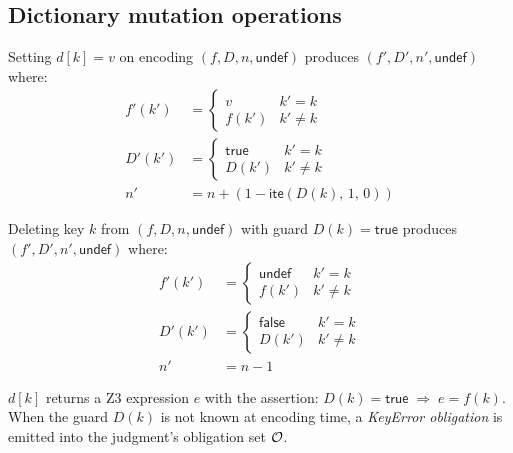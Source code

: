 \documentclass[11pt]{article}
\begin{document}
\subsection{Dictionary mutation operations}

\begin{definition}\label{def:dictins}
Setting $d[k] = v$ on encoding $(f, D, n, \mathsf{undef})$ produces
$(f', D', n', \mathsf{undef})$ where:
\begin{align}
  f'(k') &= \begin{cases} v & k' = k \\ f(k') & k' \neq k \end{cases} \tag{DI-Val}\\
  D'(k') &= \begin{cases} \mathsf{true} & k' = k \\ D(k') & k' \neq k \end{cases} \tag{DI-Dom}\\
  n'     &= n + (1 - \mathsf{ite}(D(k),\,1,\,0)) \tag{DI-Card}
\end{align}
\end{definition}

\begin{definition}\label{def:dictdel}
Deleting key $k$ from $(f, D, n, \mathsf{undef})$ with guard $D(k) =
\mathsf{true}$ produces $(f', D', n', \mathsf{undef})$ where:
\begin{align}
  f'(k')  &= \begin{cases} \mathsf{undef} & k' = k \\ f(k') & k' \neq k \end{cases} \tag{DD-Val}\\
  D'(k')  &= \begin{cases} \mathsf{false} & k' = k \\ D(k') & k' \neq k \end{cases} \tag{DD-Dom}\\
  n'      &= n - 1 \tag{DD-Card}
\end{align}
\end{definition}

\begin{definition}\label{def:dictlookup}
$d[k]$ returns a Z3 expression $e$ with the assertion:
$D(k) = \mathsf{true} \;\Rightarrow\; e = f(k)$.
When the guard $D(k)$ is not known at encoding time, a \emph{KeyError
obligation} is emitted into the judgment's obligation set $\mathcal{O}$.
\end{definition}
\end{document}
